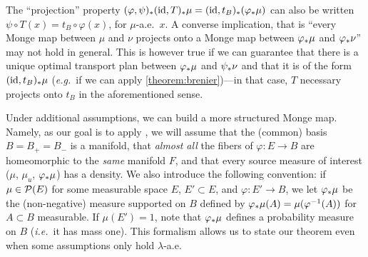 \begin{remark}
The ``projection'' property $(\varphi,\psi)_*(\operatorname{id},T)_* \mu = (\operatorname{id}, t_B) _*(\varphi _* \mu)$ can also be written $\psi \circ T(x) = t_B \circ \varphi(x)$, for $\mu$-a.e.~$x$.
A converse implication, that is ``every Monge map between $\mu$ and $\nu$ projects onto a Monge map between $\varphi_*\mu$ and $\varphi_*\nu$'' may not hold in general.
This is however true if we can guarantee that there is a unique optimal transport plan between $\varphi_*\mu$ and $\psi_*\nu$ and that it is of the form $(\operatorname{id},t_B)_*\mu$ (\textit{e.g.}~if we can apply \cref{theorem:brenier})---in that case, $T$ necessary projects onto $t_B$ in the aforementioned sense.
\end{remark}

Under additional assumptions, we can build a more structured Monge map.
Namely, as our goal is to apply , we will assume that the (common) basis $B = B_+ = B_-$ is a manifold, that \emph{almost all} the fibers of $\varphi : E \to B$ are homeomorphic to the \emph{same} manifold $F$, and that every source measure of interest ($\mu$, $\mu_u$, $\varphi_*\mu$) has a density.
We also introduce the following convention: if $\mu \in \mathcal{P}(E)$ for some measurable space $E$, $E' \subset E$, and $\varphi : E' \to B$, we let $\varphi_*\mu$ be the (non-negative) measure supported on $B$ defined by $\varphi_*\mu(A) = \mu(\varphi^{-1}(A))$ for $A \subset B$ measurable.
If $\mu(E') = 1$, note that $\varphi_*\mu$ defines a probability measure on $B$ (\textit{i.e.}~it has mass one).
This formalism allows us to state our theorem even when some assumptions only hold $\lambda$-a.e.


